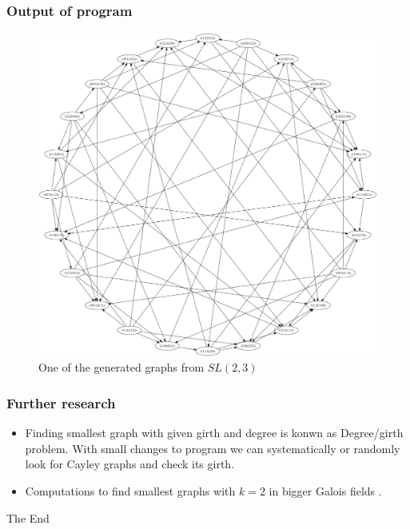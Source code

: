 \documentclass{beamer}
\begin{document}
\begin{frame}
	\frametitle{Output of program}
	\begin{figure}[!ht]
 		\centering
 		\includegraphics[scale=0.12]{example.png}
		\caption{One of the generated graphs from $SL(2,3)$ }
	\end{figure}
\end{frame}
\begin{frame}
	\frametitle{Further research}
	\begin{itemize}
		\item Finding smallest graph with given girth and degree is konwn as Degree/girth problem. With small changes to program we can systematically or randomly look for Cayley graphs and check its girth.
		\item Computations to find smallest graphs with $k=2$ in bigger Galois fields .
	\end{itemize}
\end{frame}
\begin{frame}
\Huge{\centerline{The End}}
\end{frame}
\end{document}
